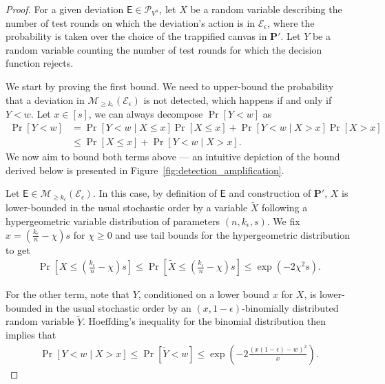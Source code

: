 \documentclass[12pt]{iopart}
\newcommand{\cptp}[1]{\mathsf{#1}} \newcommand{\pd}[1]{\mathcal{#1}}  \newcommand{\sch}[1]{\bm{#1}}
\renewcommand{\1}{\mathds{1}}
\begin{document}
\begin{proof}
  
	For a given deviation $\cptp E \in \mathcal P_{V^n}$, let $X$ be a random variable describing the number of test rounds on which the deviation's action is in $\mathcal E_\epsilon$, where the probability is taken over the choice of the trappified canvas in $\sch P'$. Let $Y$ be a random variable counting the number of test rounds for which the decision function rejects.
	
	We start by proving the first bound. We need to upper-bound the probability that a deviation in $\mathcal{M}_{\geq k_\epsilon}(\mathcal E_\epsilon)$ is not detected, which happens if and only if $Y < w$. Let $x \in [s]$, we can always decompose $\Pr \left[ Y < w \right]$ as
	\begin{align}
		\Pr \left[ Y < w \right] &= \Pr \left[ Y < w \mid X \leq x \right]\Pr \left[ X \leq x \right] + \Pr \left[ Y < w \mid X > x \right]\Pr \left[ X > x \right]\\
		&\leq \Pr \left[ X \leq x \right] + \Pr \left[ Y < w \mid X > x \right].
	\end{align}
	We now aim to bound both terms above --- an intuitive depiction of the bound derived below is presented in Figure~\ref{fig:detection_amplification}.
	
	Let $\cptp E \in \mathcal{M}_{\geq k_\epsilon}(\mathcal E_\epsilon)$. In this case, by definition of $\cptp E$ and construction of $\sch P'$, $X$ is lower-bounded in the usual stochastic order by a variable $\tilde{X}$ following a hypergeometric variable distribution of parameters $(n, k_\epsilon, s)$. We fix $x = \left( \frac{k_\epsilon}{n} - \chi \right) s$ for $\chi \geq 0$ and use tail bounds for the hypergeometric distribution to get
	\begin{align}
		\Pr \left[ X \leq \left( \frac{k_\epsilon}{n} - \chi \right) s \right] \leq \Pr \left[ \tilde{X} \leq \left( \frac{k_\epsilon}{n} - \chi \right) s \right] \leq \exp \left( -2 \chi^2 s \right).
	\end{align}
	
	For the other term, note that $Y$, conditioned on a lower bound $x$ for $X$, is lower-bounded in the usual stochastic order by an $(x, 1-\epsilon)$-binomially distributed random variable $\tilde{Y}$. Hoeffding's inequality for the binomial distribution then implies that
	\begin{align}
		\Pr \left[ \left. Y < w \; \right| \; X > x \right] \leq \Pr \left[ \tilde{Y} < w \right] \leq \exp \left( -2 \frac{(x(1-\epsilon) - w)^2}{x} \right).
	\end{align}
	

\end{proof}
\end{document}
